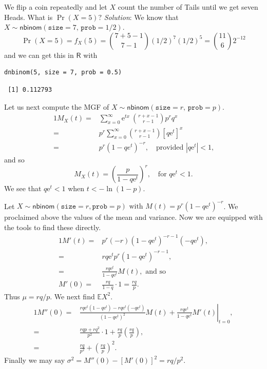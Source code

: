 \documentclass[captions=tableheading]{scrbook}
\begin{document}
\begin{example}
We flip a coin repeatedly and let \(X\) count the number of Tails until we get seven Heads. What is \(\Pr(X=5)?\)
\emph{Solution}: We know that \(X\sim\mathsf{nbinom}(\mathtt{size}=7,\,\mathtt{prob}=1/2)\).
\[
\Pr(X=5)=f_{X}(5)={7+5-1 \choose 7-1}(1/2)^{7}(1/2)^{5}={11 \choose 6}2^{-12}
\]
and we can get this in \(\mathsf{R}\) with


\begin{verbatim}
dnbinom(5, size = 7, prob = 0.5)
\end{verbatim}

\begin{verbatim}
 [1] 0.112793
\end{verbatim}

Let us next compute the MGF of \(X\sim\mathsf{nbinom}(\mathtt{size}=r,\,\mathtt{prob}=p)\).
\begin{alignat*}{1}
M_{X}(t)= & \sum_{x=0}^{\infty}\mathrm{e}^{tx}\ {r+x-1 \choose r-1}p^{r}q^{x}\\
= & p^{r}\sum_{x=0}^{\infty}{r+x-1 \choose r-1}[q\mathrm{e}^{t}]^{x}\\
= & p^{r}(1-qe^{t})^{-r},\quad\mbox{provided $|q\mathrm{e}^{t}|<1$,}
\end{alignat*}
and so
\begin{equation}
M_{X}(t)=\left(\frac{p}{1-q\mathrm{e}^{t}}\right)^{r},\quad\mbox{for $q\mathrm{e}^{t}<1$}.
\end{equation}
We see that \(q\mathrm{e}^{t}<1\) when \(t<-\ln(1-p)\).

Let \(X\sim\mathsf{nbinom}(\mathtt{size}=r,\mathtt{prob}=p)\mbox{ with $M(t)=p^{r}(1-q\mathrm{e}^{t})^{-r}$}\). We proclaimed above the values of the mean and variance. Now we are equipped with the tools to find these directly.
\begin{alignat*}{1}
M'(t)= & p^{r}(-r)(1-q\mathrm{e}^{t})^{-r-1}(-q\mathrm{e}^{t}),\\
= & rq\mathrm{e}^{t}p^{r}(1-q\mathrm{e}^{t})^{-r-1},\\
= & \frac{rq\mathrm{e}^{t}}{1-q\mathrm{e}^{t}}M(t),\mbox{ and so }\\
M'(0)= & \frac{rq}{1-q}\cdot1=\frac{rq}{p}.
\end{alignat*}
Thus \(\mu=rq/p\). We next find \(\mathbb{E} X^{2}\).
\begin{alignat*}{1}
M''(0)= & \left.\frac{rq\mathrm{e}^{t}(1-q\mathrm{e}^{t})-rq\mathrm{e}^{t}(-q\mathrm{e}^{t})}{(1-q\mathrm{e}^{t})^{2}}M(t)+\frac{rq\mathrm{e}^{t}}{1-q\mathrm{e}^{t}}M'(t)\right|_{t=0},\\
= & \frac{rqp+rq^{2}}{p^{2}}\cdot1+\frac{rq}{p}\left(\frac{rq}{p}\right),\\
= & \frac{rq}{p^{2}}+\left(\frac{rq}{p}\right)^{2}.
\end{alignat*}
Finally we may say \( \sigma^{2} = M''(0) - [M'(0)]^{2} = rq/p^{2}. \)
\end{example}
\end{document}
